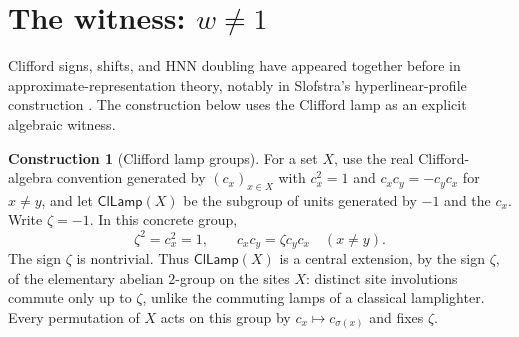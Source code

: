 \documentclass[11pt]{amsart}
\newcommand{\leanverified}[2]{\ignorespaces}
\theoremstyle{definition}
\newtheorem{construction}[theorem]{Construction}
\theoremstyle{remark}
\theoremstyle{plain}
\newcommand{\ClLamp}{\mathsf{ClLamp}}
\begin{document}
\section{The witness: \texorpdfstring{$w\neq 1$}{w is nontrivial}}\label{sec:witness}

Clifford signs, shifts, and HNN doubling have appeared together before in
approximate-representation theory, notably in Slofstra's hyperlinear-profile
construction \cite[Section~2]{SlofstraProfile}.  The construction below uses
the Clifford lamp as an explicit algebraic witness.

\begin{construction}[Clifford lamp groups]\label{con:clifford}
For a set $X$, use the real Clifford-algebra convention generated by
$(c_x)_{x\in X}$ with $c_x^2=1$ and $c_xc_y=-c_yc_x$ for $x\ne y$, and let
$\ClLamp(X)$ be the subgroup of units generated by $-1$ and the $c_x$.
Write $\zeta=-1$.  In this concrete group,
\[
 \zeta^2=c_x^2=1,\qquad c_xc_y=\zeta c_yc_x\quad(x\ne y).
\]
The sign $\zeta$ is nontrivial.  Thus $\ClLamp(X)$ is a central
extension, by the sign $\zeta$, of the elementary abelian $2$-group on
the sites $X$: distinct site involutions commute only up to $\zeta$,
unlike the commuting lamps of a classical lamplighter.  Every
permutation of $X$ acts on this
group by $c_x\mapsto c_{\sigma(x)}$ and fixes $\zeta$.
\leanverified{Sofic/ManuscriptExactWrappers}{GroupApproximation.ManuscriptExactWrappers.manuscriptCliffordConstruction}
\end{construction}
\end{document}
